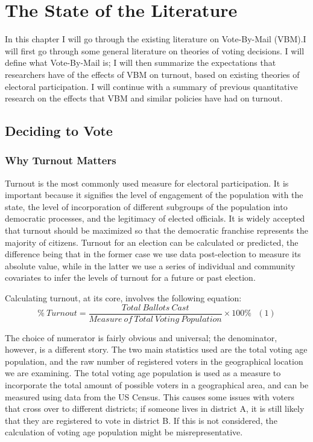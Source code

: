 \documentclass[12pt,twoside]{reedthesis}
\begin{document}
  \chapter{The State of the Literature}\label{rmd-basics}
  
  In this chapter I will go through the existing literature on
  Vote-By-Mail (VBM).I will first go through some general literature on
  theories of voting decisions. I will define what Vote-By-Mail is; I will
  then summarize the expectations that researchers have of the effects of
  VBM on turnout, based on existing theories of electoral participation. I
  will continue with a summary of previous quantitative research on the
  effects that VBM and similar policies have had on turnout.
  
  \section{Deciding to Vote}\label{deciding-to-vote}
  
  \subsection{Why Turnout Matters}\label{why-turnout-matters}
  
  Turnout is the most commonly used measure for electoral participation.
  It is important because it signifies the level of engagement of the
  population with the state, the level of incorporation of different
  subgroups of the population into democratic processes, and the
  legitimacy of elected officials. It is widely accepted that turnout
  should be maximized so that the democratic franchise represents the
  majority of citizens. Turnout for an election can be calculated or
  predicted, the difference being that in the former case we use data
  post-election to measure its absolute value, while in the latter we use
  a series of individual and community covariates to infer the levels of
  turnout for a future or past election.
  
  Calculating turnout, at its core, involves the following equation:\\
  \[ \% ~Turnout = \frac{Total~Ballots~Cast}{Measure~of~Total~Voting~Population}\times100\%~~~(1)\]
  
  The choice of numerator is fairly obvious and universal; the
  denominator, however, is a different story. The two main statistics used
  are the total voting age population, and the raw number of registered
  voters in the geographical location we are examining. The total voting
  age population is used as a measure to incorporate the total amount of
  possible voters in a geographical area, and can be measured using data
  from the US Census. This causes some issues with voters that cross over
  to different districts; if someone lives in district A, it is still
  likely that they are registered to vote in district B. If this is not
  considered, the calculation of voting age population might be
  misrepresentative.
  
\end{document}
